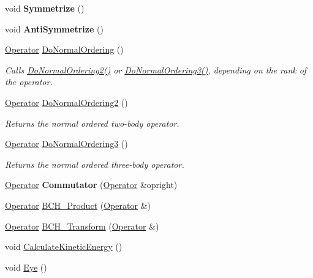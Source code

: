 \begin{DoxyCompactItemize}
\item 
\hypertarget{classOperator_a98d4075d734523186162492a4a45b420}{void {\bfseries Symmetrize} ()}\label{classOperator_a98d4075d734523186162492a4a45b420}

\item 
\hypertarget{classOperator_a21a37daa051c248109153e6502b8280f}{void {\bfseries Anti\-Symmetrize} ()}\label{classOperator_a21a37daa051c248109153e6502b8280f}

\item 
\hypertarget{classOperator_a622880b91a902c832b867c6447a262e7}{\hyperlink{classOperator}{Operator} \hyperlink{classOperator_a622880b91a902c832b867c6447a262e7}{Do\-Normal\-Ordering} ()}\label{classOperator_a622880b91a902c832b867c6447a262e7}

\begin{DoxyCompactList}\small\item\em Calls \hyperlink{classOperator_a652d989590422a2b26e662625b07254e}{Do\-Normal\-Ordering2()} or \hyperlink{classOperator_a7fd029569796107c87ff17c5a7912480}{Do\-Normal\-Ordering3()}, depending on the rank of the operator. \end{DoxyCompactList}\item 
\hyperlink{classOperator}{Operator} \hyperlink{classOperator_a652d989590422a2b26e662625b07254e}{Do\-Normal\-Ordering2} ()
\begin{DoxyCompactList}\small\item\em Returns the normal ordered two-\/body operator. \end{DoxyCompactList}\item 
\hyperlink{classOperator}{Operator} \hyperlink{classOperator_a7fd029569796107c87ff17c5a7912480}{Do\-Normal\-Ordering3} ()
\begin{DoxyCompactList}\small\item\em Returns the normal ordered three-\/body operator. \end{DoxyCompactList}\item 
\hypertarget{classOperator_a9d78ca5fd265cf4ccc6cda81d35cb086}{\hyperlink{classOperator}{Operator} {\bfseries Commutator} (\hyperlink{classOperator}{Operator} \&opright)}\label{classOperator_a9d78ca5fd265cf4ccc6cda81d35cb086}

\item 
\hyperlink{classOperator}{Operator} \hyperlink{classOperator_a6a91cd02db723ee28b7532e6af029033}{B\-C\-H\-\_\-\-Product} (\hyperlink{classOperator}{Operator} \&)
\item 
\hyperlink{classOperator}{Operator} \hyperlink{classOperator_adc5537604f6b71121163370aca79dfef}{B\-C\-H\-\_\-\-Transform} (\hyperlink{classOperator}{Operator} \&)
\item 
void \hyperlink{classOperator_a701c64f8be794e89fd28a643b56d534a}{Calculate\-Kinetic\-Energy} ()
\item 
\hypertarget{classOperator_a03a378f0da2fe71d8160bd3262891457}{void \hyperlink{classOperator_a03a378f0da2fe71d8160bd3262891457}{Eye} ()}\label{classOperator_a03a378f0da2fe71d8160bd3262891457}


\end{DoxyCompactItemize}
